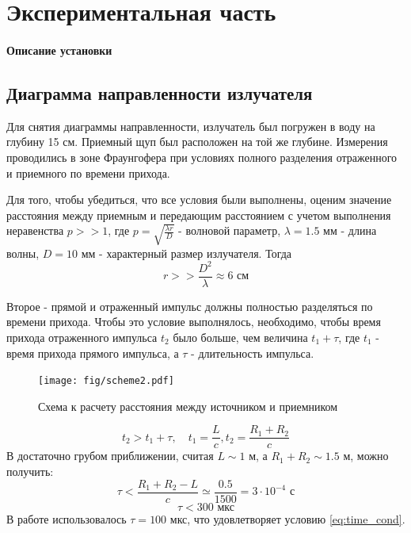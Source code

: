 \newpage
\section{Экспериментальная часть}
\paragraph{Описание установки}

\subsection{Диаграмма направленности излучателя}
Для снятия диаграммы направленности, излучатель был погружен в воду на глубину 15 см. Приемный щуп был расположен на той же глубине. Измерения проводились в зоне Фраунгофера при условиях полного разделения отраженного и приемного по времени прихода. 

Для того, чтобы убедиться, что все условия были выполнены, оценим значение расстояния между приемным и передающим расстоянием с учетом выполнения неравенства $p>>1$, где $\displaystyle p=\sqrt{\frac{\lambda r}{D}}$ - волновой параметр, $\lambda=1.5 \text{ мм}$ - длина волны, $D=10 \text{ мм}$ - характерный размер излучателя. Тогда 
\begin{equation}
r>>\frac{D^2}{\lambda}\approx 6 \text{ см}
\label{eq:pr1}
\end{equation}


Второе - прямой и отраженный импульс должны полностью разделяться по времени прихода. Чтобы это условие выполнялось,
необходимо, чтобы время прихода отраженного импульса $t_2$ было больше, чем величина $t_1+\tau$, где $t_1$ - время
прихода прямого импульса, а $\tau$ - длительность импульса.
\begin{figure}[h!]
	\centering
	\texttt{[image: fig/scheme2.pdf]}
	\caption{Схема к расчету расстояния между источником и приемником}
	\label{fig:expt:scheme2}
\end{figure}

\begin{equation}
	t_2 > t_1 + \tau, \quad t_1 = \frac{L}{c}, t_2 = \frac{R_1+R_2}{c}
\end{equation}
В достаточно грубом приближении, считая $L \sim 1$ м, а $R_1+R_2 \sim 1.5$ м, можно получить:
\begin{equation}
	\tau < \frac{R_1+R_2-L}{c} \simeq \frac{0.5}{1500} = 3 \cdot 10^{-4} \text{ с}
\end{equation}
\begin{equation}
	\tau < 300 \text{ мкс}
	\label{eq:time_cond}
\end{equation}
В работе использовалось $\tau = 100$ мкс, что удовлетворяет условию \eqref{eq:time_cond}.

